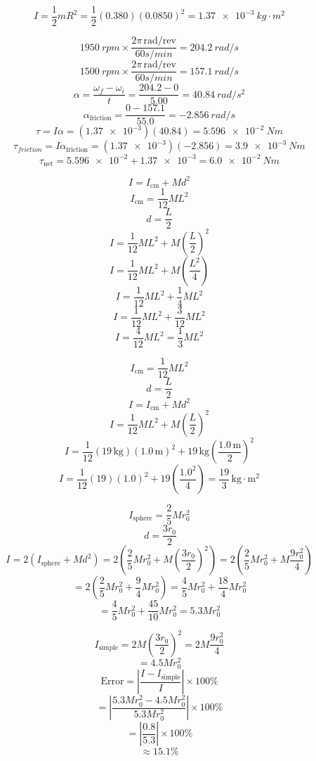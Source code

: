 \documentclass[11pt]{homework}
\begin{document}
\setcounter{questionCounter}{36}
\question
\begin{alphaparts}
\questionpart
\[
I = \frac{1}{2}mR^2 = \frac{1}{2}(0.380)(0.0850)^2 = \boxed{\qty{1.37e-3}{kg \cdot m^2}}
\]

\questionpart
\[
    \qty{1950}{rpm} \times \frac{2\pi\, \text{rad/rev}}{60\unit{s/min}} = \qty{204.2}{rad /s}
\]
\[
    \qty{1500}{rpm} \times \frac{2\pi\, \text{rad/rev}}{60\unit{s/min}} = \qty{157.1}{rad /s}
\]
\[
\alpha=\frac{\omega_f-\omega_i}{t} = \frac{204.2-0}{5.00} = \qty{40.84}{rad /s^2}
\]
\[
\alpha_{\text{friction}} = \frac{0-157.1}{55.0}=\qty{-2.856}{rad /s}
\]
\[
    \tau = I\alpha = (\qty{1.37e-3})(40.84) = \qty{5.596e-2}{Nm}
\]
\[
    \tau_{friction}=I\alpha_{\text{friction}} = (\qty{1.37e-3})(-2.856) = \qty{3.9e-3}{Nm}
\]
\[
    \tau_{\text{net}} = \qty{5.596e-2} + \qty{1.37e-3} = \boxed{\qty{6.0e-2}{Nm}}
\]



\end{alphaparts}


\setcounter{questionCounter}{52}
\question
\[
I = I_{\text{cm}} + M d^2
\]
\[
I_{\text{cm}} = \frac{1}{12} M L^2
\]
\[
d = \frac{L}{2}
\]
\[
I = \frac{1}{12} M L^2 + M \left(\frac{L}{2}\right)^2
\]
\[
I = \frac{1}{12} M L^2 + M \left(\frac{L^2}{4}\right)
\]
\[
I = \frac{1}{12} M L^2 + \frac{1}{4} M L^2
\]
\[
I = \frac{1}{12} M L^2 + \frac{3}{12} M L^2
\]
\[
    I = \frac{4}{12} M L^2 = \boxed{\frac{1}{3} M L^2}
\]


\question
\[
I_{\text{cm}} = \frac{1}{12} M L^2
\]\[
d = \frac{L}{2}
\]\[
I = I_{\text{cm}} + M d^2
\]\[
I = \frac{1}{12} M L^2 + M \left(\frac{L}{2}\right)^2
\]\[
I = \frac{1}{12} (19 \, \text{kg})(1.0 \, \text{m})^2 + 19 \, \text{kg} \left(\frac{1.0 \, \text{m}}{2}\right)^2
\]\[
I = \frac{1}{12} (19)(1.0)^2 + 19 \left(\frac{1.0^2}{4}\right)
= \boxed{\frac{19}{3} \, \text{kg} \cdot \text{m}^2}
\]
\question
\begin{alphaparts}
\questionpart
\[
I_{\text{sphere}} = \frac{2}{5} M r_0^2
\]
\[
 \ d = \frac{3 r_0}{2}
\]
\[
I = 2 \left(I_{\text{sphere}} + M d^2\right)= 2 \left(\frac{2}{5} M r_0^2 + M \left(\frac{3 r_0}{2}\right)^2\right) = 2 \left(\frac{2}{5} M r_0^2 + M \frac{9 r_0^2}{4}\right)
\]
\[
= 2 \left(\frac{2}{5} M r_0^2 + \frac{9}{4} M r_0^2\right)
= \frac{4}{5} M r_0^2 + \frac{18}{4} M r_0^2
\]
\[
= \frac{4}{5} M r_0^2 + \frac{45}{10} M r_0^2
= \boxed{5.3 M r_0^2}
\]

\questionpart
\[
I_{\text{simple}} = 2 M \left(\frac{3 r_0}{2}\right)^2
= 2 M \frac{9 r_0^2}{4}
\]
\[
= 4.5 M r_0^2
\]
\[
\text{Error} = \left|\frac{I - I_{\text{simple}}}{I}\right| \times 100\%
\]
\[
= \left|\frac{5.3 M r_0^2 - 4.5 M r_0^2}{5.3 M r_0^2}\right| \times 100\%
\]
\[
 = \left|\frac{0.8}{5.3}\right| \times 100\%
\]
\[
    \approx \boxed{15.1\%}
\]
\end{alphaparts}
\end{document}
